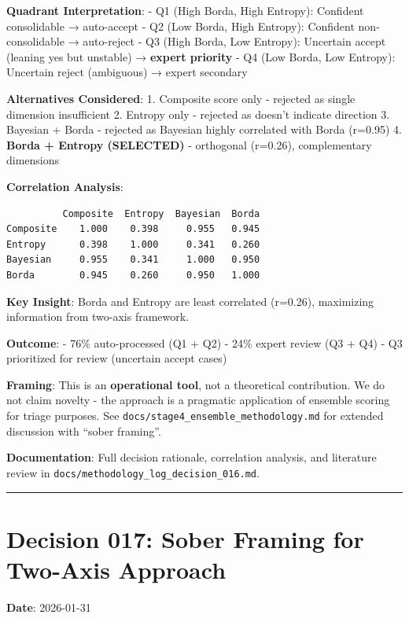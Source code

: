 \documentclass[
  letterpaper,
]{report}
\begin{document}
\textbf{Quadrant Interpretation}: - Q1 (High Borda, High Entropy):
Confident consolidable → auto-accept - Q2 (Low Borda, High Entropy):
Confident non-consolidable → auto-reject - Q3 (High Borda, Low Entropy):
Uncertain accept (leaning yes but unstable) → \textbf{expert priority} -
Q4 (Low Borda, Low Entropy): Uncertain reject (ambiguous) → expert
secondary

\textbf{Alternatives Considered}: 1. Composite score only - rejected as
single dimension insufficient 2. Entropy only - rejected as doesn't
indicate direction 3. Bayesian + Borda - rejected as Bayesian highly
correlated with Borda (r=0.95) 4. \textbf{Borda + Entropy (SELECTED)} -
orthogonal (r=0.26), complementary dimensions

\textbf{Correlation Analysis}:

\begin{verbatim}
          Composite  Entropy  Bayesian  Borda
Composite    1.000    0.398     0.955   0.945
Entropy      0.398    1.000     0.341   0.260
Bayesian     0.955    0.341     1.000   0.950
Borda        0.945    0.260     0.950   1.000
\end{verbatim}

\textbf{Key Insight}: Borda and Entropy are least correlated (r=0.26),
maximizing information from two-axis framework.

\textbf{Outcome}: - 76\% auto-processed (Q1 + Q2) - 24\% expert review
(Q3 + Q4) - Q3 prioritized for review (uncertain accept cases)

\textbf{Framing}: This is an \textbf{operational tool}, not a
theoretical contribution. We do not claim novelty - the approach is a
pragmatic application of ensemble scoring for triage purposes. See
\texttt{docs/stage4\_ensemble\_methodology.md} for extended discussion
with ``sober framing''.

\textbf{Documentation}: Full decision rationale, correlation analysis,
and literature review in
\texttt{docs/methodology\_log\_decision\_016.md}.

\begin{center}\rule{0.5\linewidth}{0.5pt}\end{center}

\section{Decision 017: Sober Framing for Two-Axis
Approach}\label{decision-017-sober-framing-for-two-axis-approach}

\textbf{Date}: 2026-01-31
\end{document}

